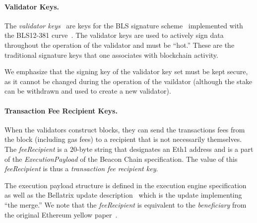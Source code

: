 \paragraph{Validator Keys.}  The \emph{validator keys}~\cite{EthVal} are keys for the BLS signature scheme~\cite{AC:BonLynSha01} implemented with the BLS12-381 curve~\cite{BLS12-318}.  The validator keys are used to actively sign data throughout the operation of the validator and must be ``hot.'' These are the traditional signature keys that one associates with blockchain activity.

We emphasize that the signing key of the validator key set must be kept secure, as it cannot be changed during the operation of the vaildator (although the stake can be withdrawn and used to create a new validator).

\paragraph{Transaction Fee Recipient Keys.}    When the validators construct blocks, they can send the transactions fees from the block (including gas fees) to a recipient that is not necessarily themselves.  The \emph{feeRecipient} is a $20$-byte string that designates an Eth1 address and is a part of the \emph{ExecutionPayload} of the Beacon Chain specification.  The value of this \emph{feeRecipient} is thus a \emph{transaction fee recipient key}.  

The execution payload structure is defined in the execution engine specification~\cite{EthEng} as well as the Bellatrix update description~\cite{EthBella} which is the update implementing ``the merge.''  We note that the \emph{feeRecipient} is equivalent to the \emph{beneficiary} from the original Ethereum yellow paper~\cite{wood2014ethereum}.